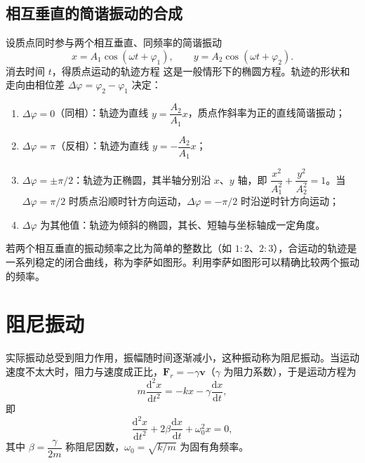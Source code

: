    \subsection{相互垂直的简谐振动的合成}
    设质点同时参与两个相互垂直、同频率的简谐振动
    \[
    x=A_1\cos(\omega t+\varphi_1),\qquad y=A_2\cos(\omega t+\varphi_2).
    \]
    消去时间 $t$，得质点运动的轨迹方程
    这是一般情形下的椭圆方程。轨迹的形状和走向由相位差 $\Delta\varphi=\varphi_2-\varphi_1$ 决定：
    \begin{enumerate}
        \item $\Delta\varphi=0$（同相）：轨迹为直线 $y=\dfrac{A_2}{A_1}x$，质点作斜率为正的直线简谐振动；
        \item $\Delta\varphi=\pi$（反相）：轨迹为直线 $y=-\dfrac{A_2}{A_1}x$；
        \item $\Delta\varphi=\pm\pi/2$：轨迹为正椭圆，其半轴分别沿 $x$、$y$ 轴，即 $\dfrac{x^{2}}{A_1^{2}}+\dfrac{y^{2}}{A_2^{2}}=1$。当 $\Delta\varphi=\pi/2$ 时质点沿顺时针方向运动，$\Delta\varphi=-\pi/2$ 时沿逆时针方向运动；
        \item $\Delta\varphi$ 为其他值：轨迹为倾斜的椭圆，其长、短轴与坐标轴成一定角度。
    \end{enumerate}
    若两个相互垂直的振动频率之比为简单的整数比（如 $1:2$、$2:3$），合运动的轨迹是一系列稳定的闭合曲线，称为李萨如图形。利用李萨如图形可以精确比较两个振动的频率。


\section{阻尼振动}
    实际振动总受到阻力作用，振幅随时间逐渐减小，这种振动称为阻尼振动。当运动速度不太大时，阻力与速度成正比，$\boldsymbol{F}_r=-\gamma\boldsymbol{v}$（$\gamma$ 为阻力系数），于是运动方程为
    \[
    m\frac{\mathrm{d}^{2}x}{\mathrm{d}t^{2}}=-kx-\gamma\frac{\mathrm{d}x}{\mathrm{d}t},
    \]
    即
    \[
    \frac{\mathrm{d}^{2}x}{\mathrm{d}t^{2}}+2\beta\frac{\mathrm{d}x}{\mathrm{d}t}+\omega_0^{2}x=0,
    \]
    其中 $\beta=\dfrac{\gamma}{2m}$ 称阻尼因数，$\omega_0=\sqrt{k/m}$ 为固有角频率。

